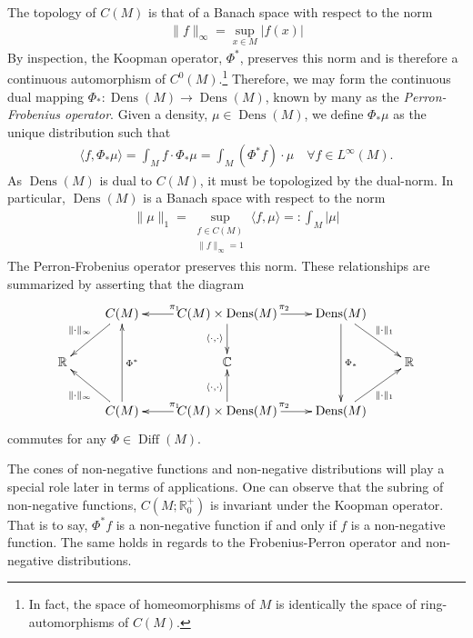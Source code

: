 \documentclass[12pt]{amsart}
\newcommand{\R}{\ensuremath{\mathbb{R}}}
\DeclareMathOperator{\Diff}{Diff}
\DeclareMathOperator{\Dens}{Dens}
\begin{document}
The topology of $C(M)$ is that of a Banach space with respect to the norm
\begin{align*}
	\| f \|_{\infty} = \sup_{x \in M} | f(x) |
\end{align*}
By inspection, the Koopman operator, $\Phi^*$, preserves this norm and is therefore
a continuous automorphism of $C^0(M)$.\footnote{In fact, the space of homeomorphisms of $M$ is identically the space of ring-automorphisms of $C(M)$.}
Therefore, we may form the continuous dual mapping $\Phi_*: \Dens(M) \to \Dens(M)$,
known by many as the \emph{Perron-Frobenius operator}.
Given a density, $\mu \in \Dens(M)$, we define $\Phi_* \mu$ as the unique distribution such that
\begin{align*}
	\langle f , \Phi_*\mu \rangle = \int_M f \cdot \Phi_* \mu = \int_M (\Phi^*f ) \cdot \mu \quad \forall f \in L^\infty(M).
\end{align*}
As $\Dens(M)$ is dual to $C(M)$, it must be topologized by the dual-norm.
In particular, $\Dens(M)$ is a Banach space with respect to the norm
\begin{align*}
	\| \mu \|_{1}  = \sup_{
		\substack{
				f \in C(M) \\
				\| f \|_{\infty} = 1
		}
	} \langle f , \mu \rangle =: \int_M | \mu |
\end{align*}
The Perron-Frobenius operator preserves this norm.
These relationships are summarized by asserting that the diagram
\begin{equation*}
	\xymatrix{
		& \ar[dl]_{\| \cdot \|_{\infty}} C(M) & \ar[l]_{\pi_1} C(M)\times \Dens(M) \ar[d]_{\langle \cdot , \cdot \rangle} \ar[r]^{\pi_2} & \Dens(M)   \ar[dd]^{\Phi_*} \ar[dr]^{\| \cdot \|_{1}}& \\
		\mathbb{R} && \mathbb{C} && \mathbb{R} \\
		& \ar[ul]^{\| \cdot \|_{\infty}} C(M) \ar[uu]_{\Phi^*} & \ar[l]_{\pi_1} C(M)\times \Dens(M) \ar[u]^{\langle \cdot , \cdot \rangle} \ar[r]^{\pi_2} & \Dens(M) \ar[ur]_{\| \cdot \|_{1}} &	
	}
\end{equation*}
commutes for any $\Phi \in \Diff(M)$.

The cones of non-negative functions and non-negative distributions will play a special role later in terms of applications.
One can observe that the subring of non-negative functions, $C(M ; \R^+_0)$ is invariant under the Koopman operator.
That is to say, $\Phi^*f$ is a non-negative function if and only if $f$ is a non-negative function.
The same holds in regards to the Frobenius-Perron operator and non-negative distributions.
\end{document}
